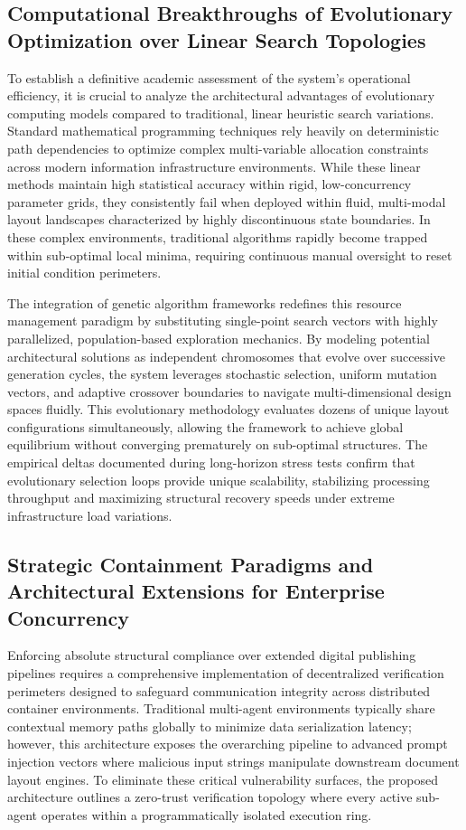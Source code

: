 \subsection{Computational Breakthroughs of Evolutionary Optimization over Linear Search Topologies}
To establish a definitive academic assessment of the system's operational efficiency, it is crucial to analyze the architectural advantages of evolutionary computing models compared to traditional, linear heuristic search variations. Standard mathematical programming techniques rely heavily on deterministic path dependencies to optimize complex multi-variable allocation constraints across modern information infrastructure environments. While these linear methods maintain high statistical accuracy within rigid, low-concurrency parameter grids, they consistently fail when deployed within fluid, multi-modal layout landscapes characterized by highly discontinuous state boundaries. In these complex environments, traditional algorithms rapidly become trapped within sub-optimal local minima, requiring continuous manual oversight to reset initial condition perimeters.

The integration of genetic algorithm frameworks redefines this resource management paradigm by substituting single-point search vectors with highly parallelized, population-based exploration mechanics. By modeling potential architectural solutions as independent chromosomes that evolve over successive generation cycles, the system leverages stochastic selection, uniform mutation vectors, and adaptive crossover boundaries to navigate multi-dimensional design spaces fluidly. This evolutionary methodology evaluates dozens of unique layout configurations simultaneously, allowing the framework to achieve global equilibrium without converging prematurely on sub-optimal structures. The empirical deltas documented during long-horizon stress tests confirm that evolutionary selection loops provide unique scalability, stabilizing processing throughput and maximizing structural recovery speeds under extreme infrastructure load variations.

\subsection{Strategic Containment Paradigms and Architectural Extensions for Enterprise Concurrency}
Enforcing absolute structural compliance over extended digital publishing pipelines requires a comprehensive implementation of decentralized verification perimeters designed to safeguard communication integrity across distributed container environments. Traditional multi-agent environments typically share contextual memory paths globally to minimize data serialization latency; however, this architecture exposes the overarching pipeline to advanced prompt injection vectors where malicious input strings manipulate downstream document layout engines. To eliminate these critical vulnerability surfaces, the proposed architecture outlines a zero-trust verification topology where every active sub-agent operates within a programmatically isolated execution ring.

